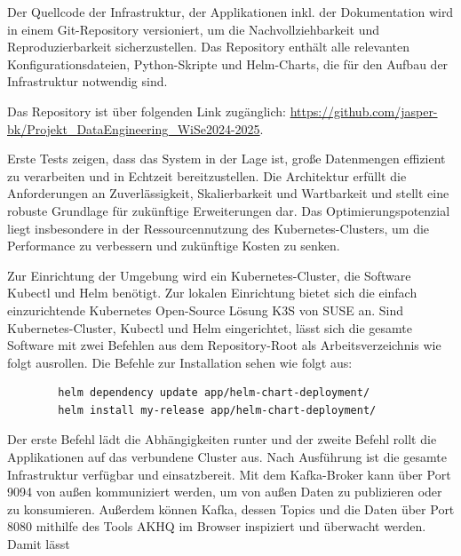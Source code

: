 \documentclass[%
pdftex,
oneside,			%
11pt,				%
parskip=half,		%
headheight = 12pt,	%
headsepline,		%
footsepline,		%
footheight = 16pt,	%
abstracton,		%
DIV=calc,		%
BCOR=8mm,		%
headinclude=false,	%
footinclude=false,	%
listof=totoc,		%
toc=bibliography,	%
]{scrreprt}	%
\begin{document}
    Der Quellcode der Infrastruktur, der Applikationen inkl. der Dokumentation wird in einem Git-Repository versioniert, um die Nachvollziehbarkeit und Reproduzierbarkeit sicherzustellen.
    Das Repository enthält alle relevanten Konfigurationsdateien, Python-Skripte und Helm-Charts, die für den Aufbau der Infrastruktur notwendig sind.

    Das Repository ist über folgenden Link zugänglich:
    \url{https://github.com/jasper-bk/Projekt_DataEngineering_WiSe2024-2025}. %

    Erste Tests zeigen, dass das System in der Lage ist, große Datenmengen effizient zu verarbeiten und in Echtzeit bereitzustellen.
    Die Architektur erfüllt die Anforderungen an Zuverlässigkeit, Skalierbarkeit und Wartbarkeit und stellt eine robuste Grundlage für zukünftige Erweiterungen dar.
    Das Optimierungspotenzial liegt insbesondere in der Ressourcennutzung des Kubernetes-Clusters, um die Performance zu verbessern und zukünftige Kosten zu senken.

    Zur Einrichtung der Umgebung wird ein Kubernetes-Cluster, die Software Kubectl und Helm benötigt.
    Zur lokalen Einrichtung bietet sich die einfach einzurichtende Kubernetes Open-Source Lösung K3S von SUSE an.
    Sind Kubernetes-Cluster, Kubectl und Helm eingerichtet, lässt sich die gesamte Software mit zwei Befehlen aus dem Repository-Root als Arbeitsverzeichnis wie folgt ausrollen.
    Die Befehle zur Installation sehen wie folgt aus:\\
    \begin{lstlisting}
        helm dependency update app/helm-chart-deployment/
        helm install my-release app/helm-chart-deployment/
    \end{lstlisting} %

    Der erste Befehl lädt die Abhängigkeiten runter und der zweite Befehl rollt die Applikationen auf das verbundene Cluster aus.
    Nach Ausführung ist die gesamte Infrastruktur verfügbar und einsatzbereit.
    Mit dem Kafka-Broker kann über Port 9094 von außen kommuniziert werden, um von außen Daten zu publizieren oder zu konsumieren.
    Außerdem können Kafka, dessen Topics und die Daten über Port 8080 mithilfe des Tools AKHQ im Browser inspiziert und überwacht werden.
    Damit lässt



\ifx\VAlterZitierstil\VTrueValue
    \printbibliography
\else
    
    
\fi
\end{document}
